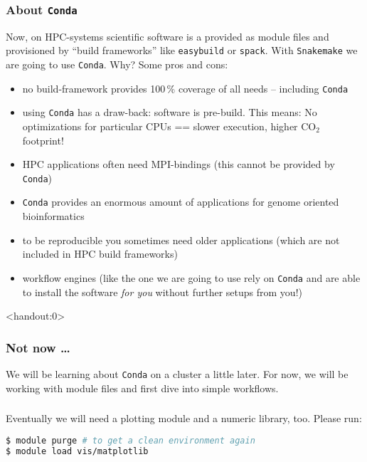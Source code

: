 \begin{frame}[fragile]
  \frametitle{About \texttt{Conda}}
  Now, on HPC-systems scientific software is a provided as module files and provisioned by ``build frameworks'' like \texttt{easybuild} or \texttt{spack}. With \texttt{Snakemake} we are going to use \texttt{Conda}. Why? Some pros and cons:\footnotesize
  \begin{itemize}[<+->]
   \item no build-framework provides 100\,\% coverage of all needs -- including \texttt{Conda}
   \item using \texttt{Conda} has a draw-back: software is pre-build. This means: No optimizations for particular CPUs == slower execution, higher CO$_2$ footprint!
   \item HPC applications often need MPI-bindings (this cannot be provided by \texttt{Conda})
   \item \texttt{Conda} provides an enormous amount of applications for genome oriented bioinformatics
   \item to be reproducible you sometimes need older applications (which are not included in HPC build frameworks)
   \item workflow engines (like the one we are going to use rely on \texttt{Conda} and are able to install the software \emph{for you} without further setups from you!)
  \end{itemize}
  \pause
\end{frame}

\begin{frame}<handout:0>
  \frametitle{Not now \ldots}
  We will be learning about \texttt{Conda} on a cluster a little later. For now, we will be working with module files and first dive into simple workflows.
\end{frame}


\begin{frame}[fragile]
  \frametitle{}
  Eventually we will need a plotting module and a numeric library, too. Please run:
  \begin{lstlisting}[language=Bash, style=Shell]
$ module purge # to get a clean environment again
$ module load vis/matplotlib
  \end{lstlisting}
  \pause
\end{frame}

